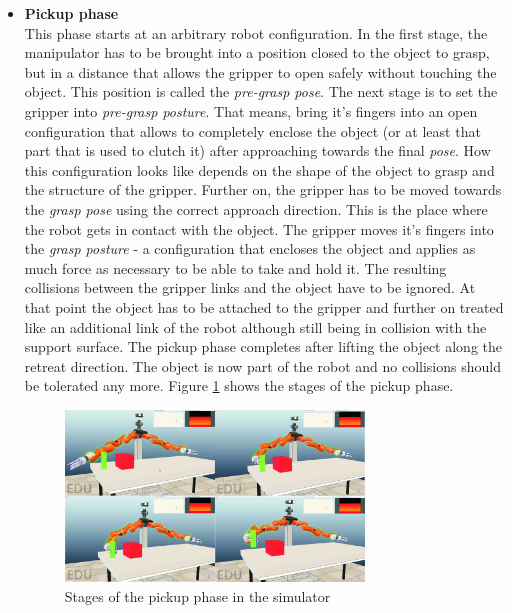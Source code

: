 \begin{itemize}

\item \textbf{Pickup phase} \\

This phase starts at an arbitrary robot configuration. In the first stage, the manipulator has to be brought into a position closed to the object to grasp, but in a distance that allows the gripper to open safely without touching the object. This position is called the \emph{pre-grasp pose}. The next stage is to set the gripper into \emph{pre-grasp posture}. That means, bring it's fingers into an open configuration that allows to completely enclose the object (or at least that part that is used to clutch it) after approaching towards the final \emph{pose}. How this configuration looks like depends on the shape of the object to grasp and the structure of the gripper. Further on, the gripper has to be moved towards the \emph{grasp pose} using the correct approach direction. This is the place where the robot gets in contact with the object. The gripper moves it's fingers into the \emph{grasp posture} - a configuration that encloses the object and applies as much force as necessary to be able to take and hold it. The resulting collisions between the gripper links and the object have to be ignored. At that point the object has to be attached to the gripper and further on treated like an additional link of the robot although still being in collision with the support surface. The pickup phase completes after lifting the object along the retreat direction. The object is now part of the robot and no collisions should be tolerated any more. Figure \ref{fig:pickup} shows the stages of the pickup phase.

\begin{figure}[ht]
	\centering
  	\includegraphics[width=0.75\textwidth]{images/pickup.jpg}
	\caption{Stages of the pickup phase in the simulator}
	\label{fig:pickup}
\end{figure}


\end{itemize}
